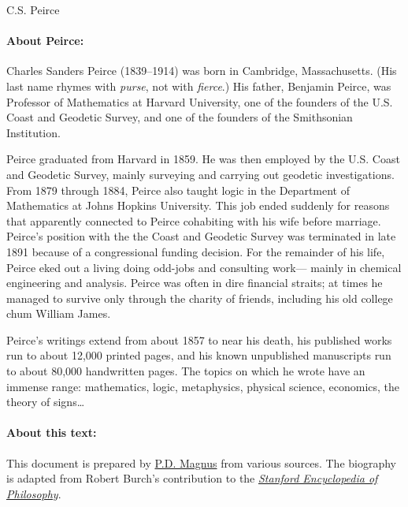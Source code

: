\documentclass[12pt]{article}
\newcommand*{\authortitle}[1]{\centerline{\Huge\sc #1}}
\begin{document}
\authortitle{C.S. Peirce}

\bigskip

\paragraph{About Peirce:}
Charles Sanders Peirce (1839--1914) was born in Cambridge, Massachusetts. (His last name rhymes with \emph{purse}, not with \emph{fierce}.) His father, Benjamin Peirce, was Professor of Mathematics at Harvard University, one of the founders of the U.S. Coast and Geodetic Survey, and one of the founders of the Smithsonian Institution.

Peirce graduated from Harvard in 1859. He was then employed by the U.S. Coast and Geodetic Survey, mainly surveying and carrying out geodetic investigations. From 1879 through 1884, Peirce also taught logic in the Department of Mathematics at Johns Hopkins University. This job ended suddenly for reasons that apparently connected to Peirce cohabiting with his wife before marriage. Peirce's position with the the Coast and Geodetic Survey was terminated in late 1891 because of a congressional funding decision. For the remainder of his life, Peirce eked out a living doing odd-jobs and consulting work--- mainly in chemical engineering and analysis. Peirce was often in dire financial straits; at times he managed to survive only through the charity of friends, including his old college chum William James.

Peirce's writings extend from about 1857 to near his death, his published works run to about 12,000 printed pages, and his known unpublished manuscripts run to about 80,000 handwritten pages. The topics on which he wrote have an immense range: mathematics, logic, metaphysics, physical science, economics, the theory of signs\ldots

\paragraph{About this text:}
This document is prepared by \href{https://www.fecundity.com}{P.D. Magnus} from various sources. The biography is adapted from Robert Burch's contribution to the \href{http://plato.stanford.edu}{\emph{Stanford Encyclopedia of Philosophy}}.





\end{document}
